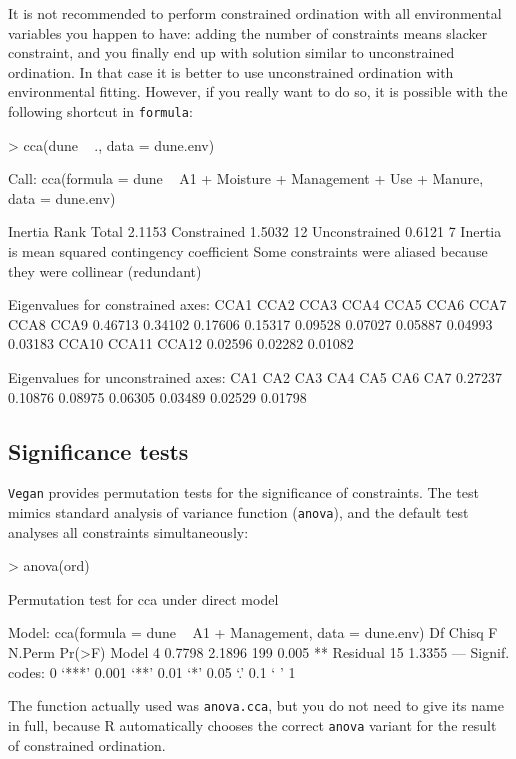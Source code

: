 \documentclass[a4paper,10pt]{amsart}
\begin{document}
It is not recommended to perform constrained ordination with all
environmental variables you happen to have: adding the number of
constraints means slacker constraint, and you finally end up with
solution similar to unconstrained ordination. In that case it is
better to use unconstrained ordination with environmental fitting.
However, if you really want to do so, it is possible with the
following shortcut in \texttt{formula}:
\begin{Schunk}
\begin{Sinput}
> cca(dune ~ ., data = dune.env)
\end{Sinput}
\begin{Soutput}
Call:
cca(formula = dune ~ A1 + Moisture + Management + Use + Manure,      data = dune.env) 

              Inertia Rank
Total          2.1153     
Constrained    1.5032   12
Unconstrained  0.6121    7
Inertia is mean squared contingency coefficient 
Some constraints were aliased because they were collinear (redundant)

Eigenvalues for constrained axes:
   CCA1    CCA2    CCA3    CCA4    CCA5    CCA6    CCA7    CCA8    CCA9 
0.46713 0.34102 0.17606 0.15317 0.09528 0.07027 0.05887 0.04993 0.03183 
  CCA10   CCA11   CCA12 
0.02596 0.02282 0.01082 

Eigenvalues for unconstrained axes:
    CA1     CA2     CA3     CA4     CA5     CA6     CA7 
0.27237 0.10876 0.08975 0.06305 0.03489 0.02529 0.01798 
\end{Soutput}
\end{Schunk}

\subsection{Significance tests}

\texttt{Vegan} provides permutation tests for the significance of
constraints.  The test mimics standard analysis of variance function
(\texttt{anova}), and the default test analyses all constraints
simultaneously:
\begin{Schunk}
\begin{Sinput}
> anova(ord)
\end{Sinput}
\begin{Soutput}
Permutation test for cca under direct model

Model: cca(formula = dune ~ A1 + Management, data = dune.env)
         Df  Chisq      F N.Perm Pr(>F)   
Model     4 0.7798 2.1896    199  0.005 **
Residual 15 1.3355                        
---
Signif. codes:  0 ‘***’ 0.001 ‘**’ 0.01 ‘*’ 0.05 ‘.’ 0.1 ‘ ’ 1 
\end{Soutput}
\end{Schunk}
The function actually used was \texttt{anova.cca}, but you do not need
to give its name in full, because \textsf{R} automatically chooses the
correct \texttt{anova} variant for the result of constrained
ordination.
\end{document}
